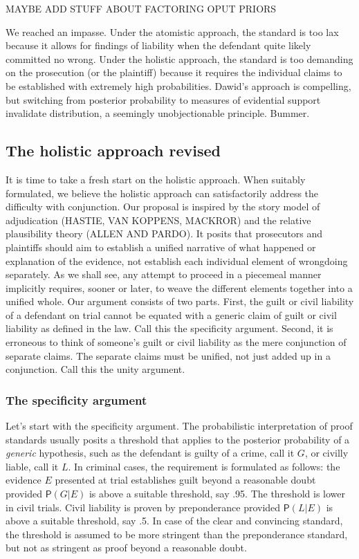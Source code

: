\documentclass[
  10pt,
  dvipsnames,enabledeprecatedfontcommands]{scrartcl}
\newcommand{\mar}[1]{\todo[color=blue!40]{#1}}
\newcommand{\pr}[1]{\mathsf{P}(#1)}
\begin{document}
MAYBE ADD STUFF ABOUT FACTORING OPUT PRIORS

We reached an impasse. Under the atomistic approach, the standard is too
lax because it allows for findings of liability when the defendant quite
likely committed no wrong. Under the holistic approach, the standard is
too demanding on the prosecution (or the plaintiff) because it requires
the individual claims to be established with extremely high
probabilities. Dawid's approach is compelling, but switching from
posterior probability to measures of evidential support invalidate
distribution, a seemingly unobjectionable principle. Bummer.

\hypertarget{the-holistic-approach-revised}{%
\subsection{The holistic approach
revised}\label{the-holistic-approach-revised}}

It is time to take a fresh start on the holistic approach. When suitably
formulated, we believe the holistic approach can satisfactorily address
the difficulty with conjunction. Our proposal is inspired by the story
model of adjudication (HASTIE, VAN KOPPENS, MACKROR) and the relative
plausibility theory (ALLEN AND PARDO). It posits that prosecutors and
plaintiffs should aim to establish a unified narrative of what happened
or explanation of the evidence, not establish each individual element of
wrongdoing separately. As we shall see, any attempt to proceed in a
piecemeal manner implicitly requires, sooner or later, to weave the
different elements together into a unified whole. Our argument consists
of two parts. First, the guilt or civil liability of a defendant on
trial cannot be equated with a generic claim of guilt or civil liability
as defined in the law. Call this the specificity
argument.\mar{R: can you very briefly indicate why?} Second, it is
erroneous to think of someone's guilt or civil liability as the mere
conjunction of separate claims. The separate claims must be unified, not
just added up in a conjunction. Call this the unity argument.

\hypertarget{the-specificity-argument}{%
\subsubsection{The specificity
argument}\label{the-specificity-argument}}

Let's start with the specificity argument. The probabilistic
interpretation of proof standards usually posits a threshold that
applies to the posterior probability of a \emph{generic} hypothesis,
such as the defendant is guilty of a crime, call it \(G\), or civilly
liable, call it \(L\). In criminal cases, the requirement is formulated
as follows: the evidence \(E\) presented at trial establishes guilt
beyond a reasonable doubt provided \(\pr{G \vert E}\) is above a
suitable threshold, say .95. The threshold is lower in civil trials.
Civil liability is proven by preponderance provided \(\pr{L \vert E}\)
is above a suitable threshold, say .5. In case of the clear and
convincing standard, the threshold is assumed to be more stringent than
the preponderance standard, but not as stringent as proof beyond a
reasonable doubt.
\end{document}

